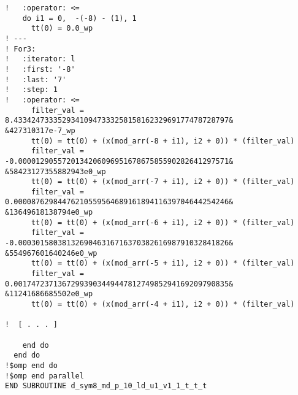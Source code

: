 \begin{lstlisting}[language={[90]Fortran},basicstyle=\footnotesize\sffamily]
!   :operator: <=
    do i1 = 0,  -(-8) - (1), 1
      tt(0) = 0.0_wp
! ---
! For3:
!   :iterator: l
!   :first: '-8'
!   :last: '7'
!   :step: 1
!   :operator: <=
      filter_val = 8.4334247333529341094733325815816232969177478728797&
&427310317e-7_wp
      tt(0) = tt(0) + (x(mod_arr(-8 + i1), i2 + 0)) * (filter_val)
      filter_val = -0.000012905572013420609695167867585590282641297571&
&58423127355882943e0_wp
      tt(0) = tt(0) + (x(mod_arr(-7 + i1), i2 + 0)) * (filter_val)
      filter_val = 0.0000876298447621055956468916189411639704644254246&
&13649618138794e0_wp
      tt(0) = tt(0) + (x(mod_arr(-6 + i1), i2 + 0)) * (filter_val)
      filter_val = -0.000301580381326904631671637038261698791032841826&
&554967601640246e0_wp
      tt(0) = tt(0) + (x(mod_arr(-5 + i1), i2 + 0)) * (filter_val)
      filter_val = 0.0017472371367299390344944781274985294169209790835&
&11241686685502e0_wp
      tt(0) = tt(0) + (x(mod_arr(-4 + i1), i2 + 0)) * (filter_val)

!  [ . . . ]

    end do
  end do
!$omp end do 
!$omp end parallel 
END SUBROUTINE d_sym8_md_p_10_ld_u1_v1_1_t_t_t
\end{lstlisting}
